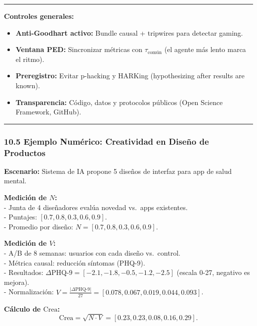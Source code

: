 \begin{center}\rule{0.5\linewidth}{0.5pt}\end{center}

\textbf{Controles generales:}

\begin{itemize}
\tightlist
\item
  \textbf{Anti-Goodhart activo:} Bundle causal + tripwires para detectar
  gaming.
\item
  \textbf{Ventana PED:} Sincronizar métricas con \(\tau_{\text{común}}\)
  (el agente más lento marca el ritmo).
\item
  \textbf{Preregistro:} Evitar p-hacking y HARKing (hypothesizing after
  results are known).
\item
  \textbf{Transparencia:} Código, datos y protocolos públicos (Open
  Science Framework, GitHub).
\end{itemize}

\begin{center}\rule{0.5\linewidth}{0.5pt}\end{center}

\subsubsection{10.5 Ejemplo Numérico: Creatividad en Diseño de
Productos}\label{ejemplo-numuxe9rico-creatividad-en-diseuxf1o-de-productos}

\textbf{Escenario:} Sistema de IA propone 5 diseños de interfaz para app
de salud mental.

\textbf{Medición de \(N\):}\\
- Junta de 4 diseñadores evalúa novedad vs.~apps existentes.\\
- Puntajes: \([0.7, 0.8, 0.3, 0.6, 0.9]\).\\
- Promedio por diseño: \(N = [0.7, 0.8, 0.3, 0.6, 0.9]\).

\textbf{Medición de \(V\):}\\
- A/B de 8 semanas: usuarios con cada diseño vs.~control.\\
- Métrica causal: reducción síntomas (PHQ-9).\\
- Resultados: \(\Delta \text{PHQ-9} = [-2.1, -1.8, -0.5, -1.2, -2.5]\)
(escala 0-27, negativo es mejora).\\
- Normalización:
\(V = \frac{|\Delta \text{PHQ-9}|}{27} = [0.078, 0.067, 0.019, 0.044, 0.093]\).

\textbf{Cálculo de \(\text{Crea}\):}\\
\[
\text{Crea} = \sqrt{N \cdot V} = [0.23, 0.23, 0.08, 0.16, 0.29].
\]

